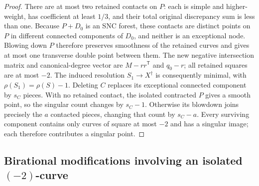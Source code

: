 \documentclass[11pt,reqno]{amsart}
\theoremstyle{definition}
\theoremstyle{remark}
\numberwithin{equation}{section}
\begin{document}
\begin{proof}
There are at most two retained contacts on $P$: each is simple and
higher-weight, has coefficient at least $1/3$, and their total original
discrepancy sum is less than one. Because $P+D_0$ is an SNC forest, these
contacts are distinct points on $P$ in different connected components
of $D_0$, and neither is an exceptional node. Blowing down $P$ therefore
preserves smoothness of the retained curves and gives at most one
transverse double point between them. The new negative intersection matrix and canonical-degree vector are
$M-rr^{\mathsf T}$ and $q_0-r$; all retained squares are at most $-2$.
The induced resolution $S_1\to X^\dagger$ is consequently minimal,
with $\rho(S_1)=\rho(S)-1$.
Deleting $C$ replaces its exceptional connected component by $s_C$ pieces.
With no retained contact, the isolated contracted $P$ gives a smooth
point, so the singular count changes by $s_C-1$.
Otherwise its blowdown joins precisely the $a$ contacted pieces,
changing that count by $s_C-a$. Every surviving component contains
only curves of square at most $-2$ and has a singular image; each therefore contributes a singular point.
\end{proof}


\subsection{Birational modifications involving an isolated $(-2)$-curve}
\end{document}
